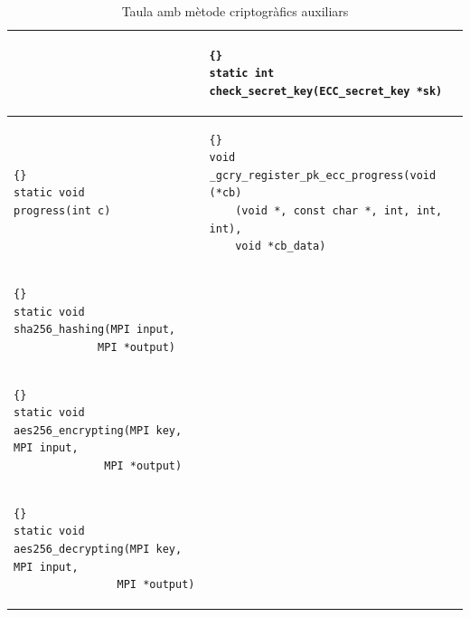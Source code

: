 \documentclass[12pt,twoside,catalan,a4paper]{book}%
\numberwithin{figure}{section}		%
\theoremstyle{definition}   			%
\theoremstyle{saltolinea}   			%
\begin{document}
\begin{table}
\begin{center}
\begin{sideways}
\begin{tabular}{|l|l|}
 &
 {\tt \begin{lstlisting}{}
static int
check_secret_key(ECC_secret_key *sk)
      \end{lstlisting} }
 \\
\hline
 {\tt \begin{lstlisting}{}
static void
progress(int c)
      \end{lstlisting} }
 &
 {\tt \begin{lstlisting}{}
void
_gcry_register_pk_ecc_progress(void (*cb)
    (void *, const char *, int, int, int),
    void *cb_data)
      \end{lstlisting} }
 \\
\hline
 {\tt \begin{lstlisting}{}
static void
sha256_hashing(MPI input,
             MPI *output)
      \end{lstlisting} }
 & \\
\hline
 {\tt \begin{lstlisting}{}
static void
aes256_encrypting(MPI key, MPI input,
              MPI *output)
      \end{lstlisting} }
 & \\
\hline
 {\tt \begin{lstlisting}{}
static void
aes256_decrypting(MPI key, MPI input,
                MPI *output)
      \end{lstlisting} }
 & \\
\hline
\end{tabular}
\end{sideways}
\end{center}
\caption{Taula amb m\`etode criptogr\`afics auxiliars \label{tab:cryptAux}}
\end{table}
\end{document}

